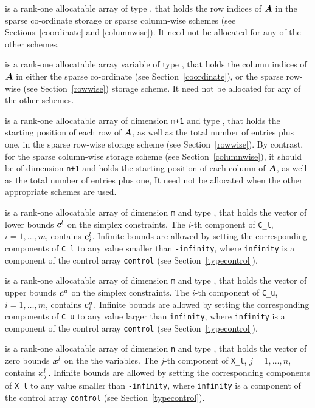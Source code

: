 \documentclass{galahad}
\begin{document}
\begin{description}
\begin{description}
 is a rank-one allocatable array of type \integer,
that holds the row indices of ${\bm{A}}$ in the sparse co-ordinate storage
or sparse column-wise schemes
(see Sections~\ref{coordinate} and \ref{columnwise}).
It need not be allocated for any of the other schemes.

 is a rank-one allocatable array variable of type \integer,
that holds the column indices of ${\bm{A}}$ in either the sparse co-ordinate
(see Section~\ref{coordinate}), or the sparse row-wise
(see Section~\ref{rowwise}) storage scheme.
It need not be allocated for any of the other schemes.

 is a rank-one allocatable array of dimension {\tt m+1} and type
\integer, that holds the starting position of each row of ${\bm{A}}$,
as well as the total number of entries plus one,
in the sparse row-wise storage scheme (see Section~\ref{rowwise}).
By contrast, for the sparse column-wise storage scheme
(see Section~\ref{columnwise}), it should be of dimension {\tt n+1}
and holds the starting position of each column of ${\bm{A}}$,
as well as the total number of entries plus one,
It need not be allocated when the other appropriate schemes are used.

\end{description}

 is a rank-one allocatable array of dimension {\tt m} and type
\realdp, that holds the vector of lower bounds ${\bm{c}}^{l}$
on the simplex constraints. The $i$-th component of
{\tt C\_l}, $i = 1, \ldots , m$, contains ${\bm{c}}_{i}^{l}$.
Infinite bounds are allowed by setting the corresponding
components of {\tt C\_l} to any value smaller than {\tt -infinity},
where {\tt infinity} is a component of the control array {\tt control}
(see Section~\ref{typecontrol}).

 is a rank-one allocatable array of dimension {\tt m} and type
\realdp, that holds the vector of upper bounds ${\bm{c}}^{u}$
on the simplex constraints. The $i$-th component of
{\tt C\_u}, $i = 1,  \ldots ,  m$, contains ${\bm{c}}_{i}^{u}$.
Infinite bounds are allowed by setting the corresponding
components of {\tt C\_u} to any value larger than {\tt infinity},
where {\tt infinity} is a component of the control array {\tt control}
(see Section~\ref{typecontrol}).

 is a rank-one allocatable array of dimension {\tt n} and type
\realdp, that holds
the vector of zero bounds ${\bm{x}}^{l}$ on the the variables.
The $j$-th component of {\tt X\_l}, $j = 1, \ldots , n$,
contains ${\bm{x}}_{j}^{l}$.
Infinite bounds are allowed by setting the corresponding
components of {\tt X\_l} to any value smaller than {\tt -infinity},
where {\tt infinity} is a component of the control array {\tt control}
(see Section~\ref{typecontrol}).


\end{description}
\end{document}
